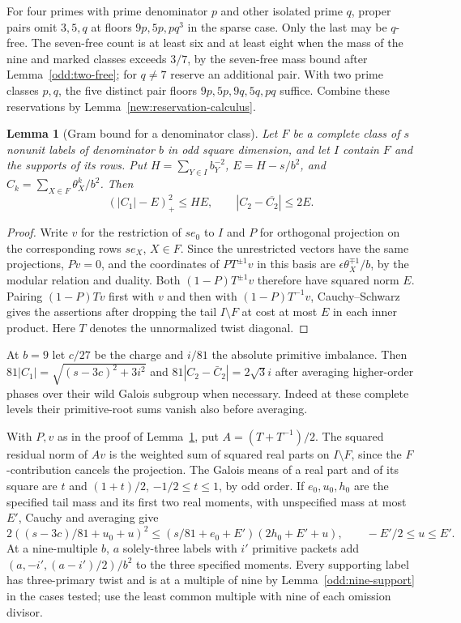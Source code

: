\documentclass[11pt]{amsart}
\numberwithin{equation}{section}
\newtheorem{lemma}[theorem]{Lemma}
\theoremstyle{definition}
\theoremstyle{plain}
\begin{document}
For four primes with prime denominator $p$ and other isolated prime
$q$, proper pairs omit $3,5,q$ at floors $9p,5p,pq^3$ in the sparse
case. Only the last may be $q$-free. The seven-free count is at least
six and at least eight when the mass of the nine and marked classes
exceeds $3/7$, by the seven-free mass bound after Lemma~\ref{odd:two-free}; for
$q\ne7$ reserve an additional pair. With two prime classes $p,q$, the five distinct pair
floors $9p,5p,9q,5q,pq$ suffice. Combine these reservations by Lemma~\ref{new:reservation-calculus}.

\begin{lemma}[Gram bound for a denominator class]\label{odd:class-gram}
Let $F$ be a complete class of $s$ nonunit labels of denominator $b$ in odd square
dimension, and let $I$ contain $F$ and the supports of its rows.
Put $H=\sum_{Y\in I}b_Y^{-2}$, $E=H-s/b^2$, and $C_k=\sum_{X\in F}\theta_X^k/b^2$.
Then
\[
  (|C_1|-E)_+^2\le HE,
  \qquad |C_2-\overline{C_2}|\le2E .
\]
\end{lemma}
\begin{proof}
Write $v$ for the restriction of $se_0$ to $I$ and $P$ for orthogonal
projection on the corresponding rows $se_X$, $X\in F$. Since the
unrestricted vectors have the same projections, $Pv=0$, and the
coordinates of $P T^{\pm1}v$ in this basis are
$\epsilon\theta_X^{\mp1}/b$, by the modular relation and duality.
Both $(1-P)T^{\pm1}v$ therefore have squared norm $E$.
Pairing $(1-P)Tv$ first with $v$ and then with $(1-P)T^{-1}v$,
Cauchy--Schwarz gives the assertions after dropping the tail
$I\setminus F$ at cost at most $E$ in each inner product.
Here $T$ denotes the unnormalized twist diagonal.
\end{proof}

At $b=9$ let $c/27$ be the charge and $i/81$ the absolute primitive imbalance. Then
$81|C_1|=\sqrt{(s-3c)^2+3i^2}$ and
$81|C_2-\bar C_2|=2\sqrt3 i$ after averaging higher-order phases
over their wild Galois subgroup when necessary. Indeed at these
complete levels their primitive-root sums vanish also before averaging.

With $P,v$ as in the proof of Lemma~\ref{odd:class-gram}, put $A=(T+T^{-1})/2$. The squared residual norm of $Av$ is the
weighted sum of squared real parts on $I\setminus F$, since the
$F$-contribution cancels the projection. The Galois means of a real
part and of its square are $t$ and $(1+t)/2$, $-1/2\le t\le1$, by
odd order. If $e_0,u_0,h_0$ are the specified tail mass and its first
two real moments, with unspecified mass at most $E'$, Cauchy and
averaging give
\[
 2((s-3c)/81+u_0+u)^2\le(s/81+e_0+E')(2h_0+E'+u),
 \qquad -E'/2\le u\le E'.
\]
At a nine-multiple $b$, $a$ solely-three labels with $i'$ primitive
packets add $(a,-i',(a-i')/2)/b^2$ to the three specified moments.
Every supporting label has three-primary twist and is at a multiple
of nine by Lemma~\ref{odd:nine-support} in the cases tested; use the
least common multiple with nine of each omission divisor.
\end{document}
